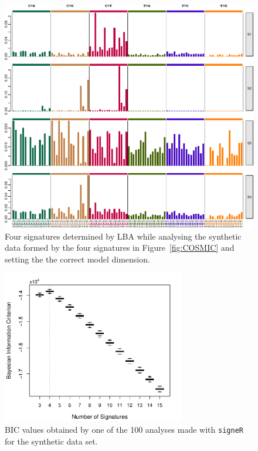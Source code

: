 \documentclass[11pt]{amsart}
\theoremstyle{definition}
\begin{document}
\begin{center}
\begin{figure}
  \includegraphics[width=16cm]{sfigs/Signature_Ale_plot_bcr1} 
  \caption{Four signatures determined by LBA while
  analysing the synthetic data formed by the four signatures in
  Figure~\ref{fig:COSMIC} and setting the the correct model
  dimension.}\label{fig:LBA} 
\end{figure}
\end{center}

\begin{center}
\begin{figure}
  \includegraphics[width=8cm]{sfigs/BICs_Simulated_21bc_with_Opportunity}
  \caption{BIC values obtained by one of the 100 analyses made with
    \texttt{signeR} for the synthetic data set.}\label{fig:BICS}
\end{figure}
\end{center}
\end{document}
